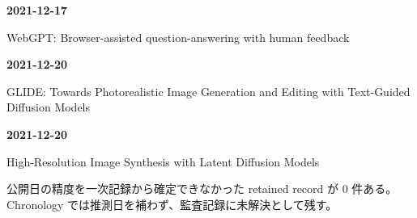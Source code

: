 \smallskip
\noindent\textbf{2021-12-17}\par
{\raggedright WebGPT: Browser-assisted question-answering with human feedback\,\cite{src-72eada5e8850}\par}
\smallskip
\noindent\textbf{2021-12-20}\par
{\raggedright GLIDE: Towards Photorealistic Image Generation and Editing with Text-Guided Diffusion Models\,\cite{src-50244427230b}\par}
\smallskip
\noindent\textbf{2021-12-20}\par
{\raggedright High-Resolution Image Synthesis with Latent Diffusion Models\,\cite{src-a4561c635fe6}\par}
\smallskip
\medskip
\begin{claimboundary}[日付精度の境界]
公開日の精度を一次記録から確定できなかった retained record が 0 件ある。Chronology では推測日を補わず、監査記録に未解決として残す。
\end{claimboundary}
